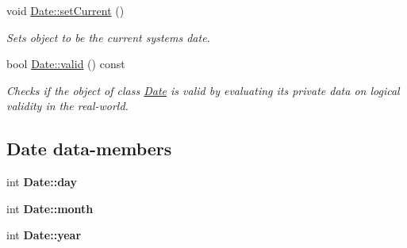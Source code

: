 \begin{DoxyCompactItemize}
\mbox{\label{group___date_gac47ebbacb1a76c4e7c1f55ca9072a640}} 
void \hyperlink{group___date_gac47ebbacb1a76c4e7c1f55ca9072a640}{Date\+::set\+Current} ()
\begin{DoxyCompactList}\small\item\em Sets object to be the current system\textquotesingle{}s date. \end{DoxyCompactList}\item 
bool \hyperlink{group___date_gac7a8c7b77f99b162a931199464c1bedc}{Date\+::valid} () const
\begin{DoxyCompactList}\small\item\em Checks if the object of class \hyperlink{class_date}{Date} is valid by evaluating it\textquotesingle{}s private data on logical validity in the real-\/world. \end{DoxyCompactList}\end{DoxyCompactItemize}
\subsection*{Date data-\/members}
\begin{DoxyCompactItemize}
\item 
\mbox{\label{group___date_ga5b192adcabf2b2871e3f0b76c1ec1601}} 
int {\bfseries Date\+::day}
\item 
\mbox{\label{group___date_ga533843e07c6ac8d19fee9b16f5336ba2}} 
int {\bfseries Date\+::month}
\item 
\mbox{\label{group___date_ga3eeced2ed56bc95d56782b9e738db8ea}} 
int {\bfseries Date\+::year}
\end{DoxyCompactItemize}

